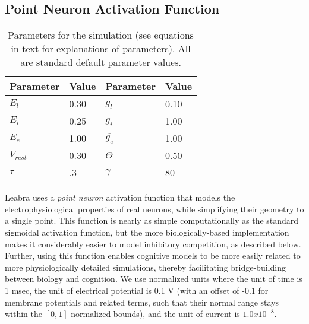 \subsection{Point Neuron Activation Function} 

\begin{table}
 \centering
 \begin{tabular}{ll|ll} \hline
Parameter & Value & Parameter & Value \\ \hline
$E_l$ & 0.30 & $\overline{g_l}$ & 0.10 \\
$E_i$ & 0.25 & $\overline{g_i}$ & 1.00 \\
$E_e$ & 1.00 & $\overline{g_e}$ & 1.00 \\
$V_{rest}$ & 0.30 & $\Theta$  & 0.50 \\
$\tau$ & .3 & $\gamma$ & 80 \\ \hline
 \end{tabular}
 \caption{\small Parameters for the simulation (see equations in text
  for explanations of parameters). All are standard default parameter values.}
 \label{tab.sim_params}
\end{table}

Leabra uses a {\em point neuron} activation function that models the electrophysiological properties of real neurons, while simplifying their geometry to a single point. This function is nearly as simple computationally as the standard sigmoidal activation function, but the more biologically-based implementation makes it considerably easier to model inhibitory competition, as described below. Further, using this function enables cognitive models to be more easily related to more physiologically detailed simulations, thereby facilitating bridge-building between biology and cognition. We use normalized units where the unit of time is 1 msec, the unit of electrical potential is 0.1 V (with an offset of -0.1 for membrane potentials and related terms, such that their normal range stays within the $[0, 1]$ normalized bounds), and the unit of current is $1.0x10^{-8}$.

